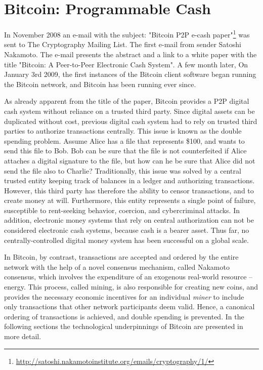 \section{Bitcoin: Programmable Cash}

 In November 2008 an e-mail with the subject: "Bitcoin P2P e-cash paper"\footnote{\url{http://satoshi.nakamotoinstitute.org/emails/cryptography/1/}} was sent to The Cryptography Mailing List. The first e-mail from sender Satoshi Nakamoto. The e-mail presents the abstract and a link to a white paper with the title "Bitcoin: A Peer-to-Peer Electronic Cash System". A few month later, On January 3rd 2009, the first instances of the Bitcoin client software began running the Bitcoin network, and Bitcoin has been running ever since. 

 As already apparent from the title of the paper, Bitcoin provides a \ac{P2P} digital cash system without reliance on a trusted third party. Since digital assets can be duplicated without cost, previous digital cash system had to rely on trusted third parties to authorize transactions centrally. This issue is known as the double spending problem. Assume Alice has a file that represents \$100, and wants to send this file to Bob. Bob can be sure that the file is not counterfeited if Alice attaches a digital signature to the file, but how can he be sure that Alice did not send the file also to Charlie? Traditionally, this issue was solved by a central trusted entity keeping track of balances in a ledger and authorizing transactions. However, this third party has therefore the ability to censor transactions, and to create money at will. Furthermore, this entity represents a single point of failure, susceptible to rent-seeking behavior, coercion, and cybercriminal attacks. In addition, electronic money systems that rely on central authorization can not be considered electronic cash systems, because cash is a bearer asset. Thus far, no centrally-controlled digital money system has been successful on a global scale.

 In Bitcoin, by contrast, transactions are accepted and ordered by the entire network with the help of a novel consensus mechanism, called Nakamoto consensus, which involves the expenditure of an exogenous real-world resource -- energy. This process, called mining, is also responsible for creating new coins, and provides the necessary economic incentives for an individual \emph{miner} to include only transactions that other network participants deem valid. Hence, a canonical ordering of transactions is achieved, and double spending is prevented. In the following sections the technological underpinnings of Bitcoin are presented in more detail. 


